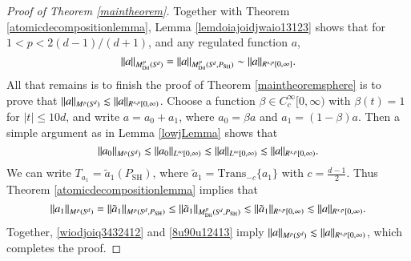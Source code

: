 \begin{proof}[Proof of Theorem \ref{maintheorem}]
Together with Theorem \ref{atomicdecompositionlemma}, Lemma \ref{lemdoiajoidjwaio13123} shows that for $1 < p < 2(d-1)/(d+1)$, and any regulated function $a$,
%
\[ \| a \|_{M^p_{\text{Dil}}({S}^{\!{d}})} = \| a \|_{M^p_{\text{Dil}}({S}^{\!{d}},P_{\text{SH}})} \sim \| a \|_{R^{s,p}[0,\infty]}. \]
%
All that remains is to finish the proof of Theorem \ref{maintheoremsphere} is to prove that $\| a \|_{M^p({S}^{\!{d}})} \lesssim \| a \|_{R^{s,p}[0,\infty)}$. Choose a function $\beta \in C_c^\infty[0,\infty)$ with $\beta(t) = 1$ for $|t| \leq 10d$, and write $a = a_0 + a_1$, where $a_0 = \beta a$ and $a_1 = (1 - \beta) a$. Then a simple argument as in Lemma \ref{lowjLemma} shows that
%
\begin{equation} \label{wiodjoiq3432412}
    \| a_0 \|_{M^p({S}^{\!{d}})} \lesssim \| a_0 \|_{L^\infty[0,\infty)} \lesssim \| a \|_{L^\infty[0,\infty)} \lesssim \| a \|_{R^{s,p}[0,\infty)}.
\end{equation}
%
We can write $T_{a_1} = \tilde{a}_1(P_{\text{SH}})$, where $\tilde{a}_1 = \text{Trans}_{-c}\{ a_1 \}$ with $c = \tfrac{d-1}{2}$. Thus Theorem \ref{atomicdecompositionlemma} implies that
%
\begin{equation} \label{8u90u12413}
    \| a_1 \|_{M^p({S}^{\!{d}})} = \| \tilde{a}_1 \|_{M^p({S}^{\!{d}}, P_{\text{SH}})} \leq \| \tilde{a}_1 \|_{M^p_{\text{Dil}}({S}^{\!{d}}, P_{\text{SH}})} \lesssim \| \tilde{a}_1 \|_{R^{s,p}[0,\infty)} \lesssim \| a \|_{R^{s,p}[0,\infty)}.
\end{equation}
%
Together, \eqref{wiodjoiq3432412} and \eqref{8u90u12413} imply $\| a \|_{M^p({S}^{\!{d}})} \lesssim \| a \|_{R^{s,p}[0,\infty)}$, which completes the proof.
%
%
\end{proof}